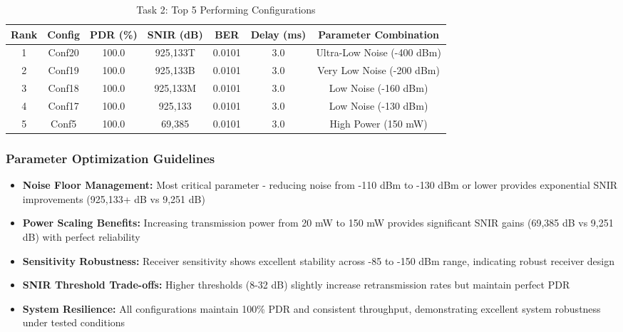 \documentclass{article}
\begin{document}
\begin{table}[H]

\centering

\caption{Task 2: Top 5 Performing Configurations}

\begin{tabular}{|c|c|c|c|c|c|c|}

\hline

Rank & Config & PDR (\%) & SNIR (dB) & BER & Delay (ms) & Parameter Combination \\

\hline

1 & Conf20 & 100.0 & 925,133T & 0.0101 & 3.0 & Ultra-Low Noise (-400 dBm) \\

2 & Conf19 & 100.0 & 925,133B & 0.0101 & 3.0 & Very Low Noise (-200 dBm) \\

3 & Conf18 & 100.0 & 925,133M & 0.0101 & 3.0 & Low Noise (-160 dBm) \\

4 & Conf17 & 100.0 & 925,133 & 0.0101 & 3.0 & Low Noise (-130 dBm) \\

5 & Conf5 & 100.0 & 69,385 & 0.0101 & 3.0 & High Power (150 mW) \\

\hline

\end{tabular}

\end{table}

\subsubsection{Parameter Optimization Guidelines}

\begin{itemize}

  \item \textbf{Noise Floor Management:} Most critical parameter - reducing noise from -110 dBm to -130 dBm or lower provides exponential SNIR improvements (925,133+ dB vs 9,251 dB)

  \item \textbf{Power Scaling Benefits:} Increasing transmission power from 20 mW to 150 mW provides significant SNIR gains (69,385 dB vs 9,251 dB) with perfect reliability

  \item \textbf{Sensitivity Robustness:} Receiver sensitivity shows excellent stability across -85 to -150 dBm range, indicating robust receiver design

  \item \textbf{SNIR Threshold Trade-offs:} Higher thresholds (8-32 dB) slightly increase retransmission rates but maintain perfect PDR

  \item \textbf{System Resilience:} All configurations maintain 100\% PDR and consistent throughput, demonstrating excellent system robustness under tested conditions

\end{itemize}
\end{document}
